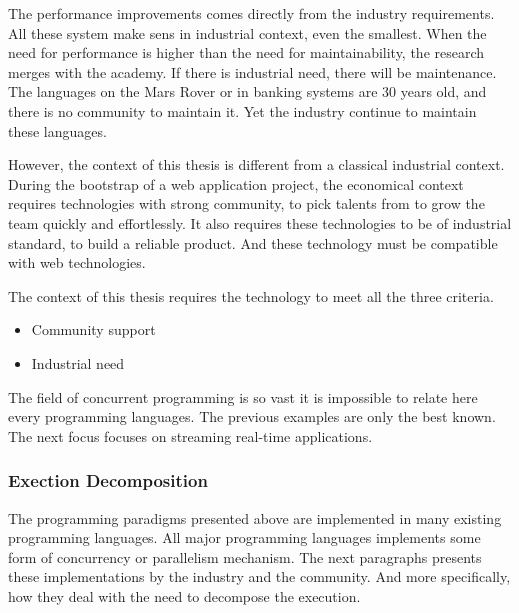 The performance improvements comes directly from the industry requirements.
All these system make sens in industrial context, even the smallest.
When the need for performance is higher than the need for maintainability, the research merges with the academy.
If there is industrial need, there will be maintenance.
The languages on the Mars Rover or in banking systems are 30 years old, and there is no community to maintain it.
Yet the industry continue to maintain these languages.

However, the context of this thesis is different from a classical industrial context.
During the bootstrap of a web application project, the economical context requires technologies with strong community, to pick talents from to grow the team quickly and effortlessly.
It also requires these technologies to be of industrial standard, to build a reliable product.
And these technology must be compatible with web technologies.

The context of this thesis requires the technology to meet all the three criteria.
\begin{itemize}
\item Community support
\item Industrial need
\end{itemize}


The field of concurrent programming is so vast it is impossible to relate here every programming languages.
The previous examples are only the best known.
The next focus focuses on streaming real-time applications.







\subsubsection{Exection Decomposition}


The programming paradigms presented above are implemented in many existing programming languages.
All major programming languages implements some form of concurrency or parallelism mechanism.
The next paragraphs presents these implementations by the industry and the community.
And more specifically, how they deal with the need to decompose the execution.

